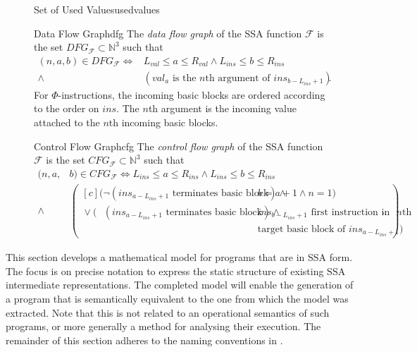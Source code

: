 \begin{figure}[p]
\begin{definition}{Set of Used Values}{usedvalues}
\end{definition}
\begin{definition}{Data Flow Graph}{dfg}
    The {\em data flow graph} of the SSA function $\mathcal F$ is the set
    $DFG_{\mathcal F}\subset \mathbb N^3$ such that
    \begin{align*}
        (n,a,b)\in DFG_{\mathcal F}\iff{}&L_{val}\leq a\leq R_{val}
            \mathrel{\land}L_{ins}\leq b\leq R_{ins}\\
            \mathrel{\land}{}&(val_a\text{ is the $n$th argument of }ins_{b-L_{ins}+1}).
    \end{align*}
    For $\Phi$-instructions, the incoming basic blocks are ordered according to
    the order on $ins$.
    The $n$th argument is the incoming value attached to the $n$th incoming
    basic blocks.
\end{definition}
\begin{definition}{Control Flow Graph}{cfg}
    The {\em control flow graph} of the SSA function $\mathcal F$ is the set
    $CFG_{\mathcal F}\subset \mathbb N^3$ such that
    \begin{align*}
        (n,a,&{}b)\in CFG_{\mathcal F}\iff L_{ins}\leq a\leq R_{ins}\mathrel{\land}L_{ins}\leq b\leq R_{ins}\\
               \mathrel{\land}&\left(\begin{aligned}[c]
                                    (\neg (ins_{a-L_{ins}+1}\text{ terminates basic block})\mathrel{\land}{}&b=a+1\mathrel{\land}n=1)\\
                      \mathrel{\lor}(\phantom{\neg}(ins_{a-L_{ins}+1}\text{ terminates basic block})\mathrel{\land}{}&ins_{b-L_{ins}+1}\text{ first instruction in}\text{ $n$th}\\[-0.5em]
                                                   &\text{target basic block of }ins_{a-L_{ins}+1})
        \end{aligned}\right).
    \end{align*}
\end{definition}
\end{figure}

    This section develops a mathematical model for programs that are in
    SSA form.
    The focus is on precise notation to express the static structure of existing
    SSA intermediate representations.
    The completed model will enable the generation of a program that is
    semantically equivalent to the one from which the model was extracted.
    Note that this is not related to an operational semantics of such programs,
    or more generally a method for analysing their execution.
    The remainder of this section adheres to the naming conventions in
    .

